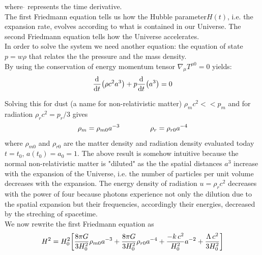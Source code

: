 \documentclass{article}
\newcommand{\beq}{\begin{equation}}
\newcommand{\eeq}{\end{equation}}
\begin{document}
where  $\dot{}$  represents the time derivative.\\
The first Friedmann equation tells us how the Hubble parameter$H(t)$, i.e. the expansion rate,  evolves according to what is contained in our Universe.
The second Friedmann equation tells how the Universe accelerates.\\
In order to solve the system we need another equation: the equation of state $p = w \rho$ that relates the the pressure and the mass density.\\
%
%
%
By using the conservation of energy momentum tensor $\nabla_\mu T^{\mu 0} =0 $ yields:
\beq
\label{energy_cons}
\dv[]{}{t}\qty(\rho c^2 a^3) + p \dv[]{}{t} \qty(a^3)  = 0
\eeq
%
%
%

Solving this for dust (a name for non-relativistic matter) $\rho_m c^2 << p_m$ and for radiation $\rho_r c^2 = p_r/3$ gives
\begin{equation}
\begin{split}
\rho_m = \rho_{m 0} a^{-3} \hspace{1.5cm} \rho_r = \rho_{r 0} a^{-4} \notag
\end{split}
\end{equation}
where $\rho_{m 0}$ and $\rho_{r 0}$ are the matter density and radiation density evaluated today $t = t_0$, $a(t_0) = a_0 =1$.
The above result is somehow intuitive because the normal non-relativistic matter is "diluted" as the the spatial distances $a^3$  increase with the expansion of the Universe, i.e. the number of particles per unit volume decreases with the expansion.
The energy density of radiation $u = \rho_r c^2 $ decreases with the power of four because photons experience not only the dilution due to the spatial expansion but their frequencies, accordingly their energies, decreased by the streching of spacetime.\\
We now rewrite the first Friedmann equation as
\begin{equation}
H ^2 = H_0 ^2 \qty[
\dfrac{8 \pi G}{3 H_0 ^2} \rho_{m 0} a^{-3}+
\dfrac{8 \pi G}{3 H_0 ^2} \rho_{r 0} a^{-4}+ 
\dfrac{-k \, c^2}{H_0 ^2} a^{-2} + \dfrac{\Lambda \, c^2}{3 H_0 ^2}
] \notag
\end{equation}
\end{document}
